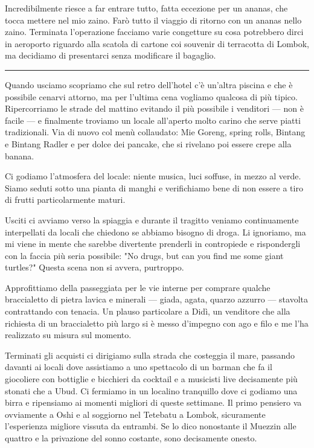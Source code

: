 Incredibilmente riesce a far entrare tutto, fatta eccezione per un ananas, che tocca mettere nel mio zaino. Farò tutto il viaggio di ritorno con un ananas nello zaino. Terminata l'operazione facciamo varie congetture su cosa potrebbero dirci in aeroporto riguardo alla scatola di cartone coi souvenir di terracotta di Lombok, ma decidiamo di presentarci senza modificare il bagaglio.

\begin{center}
    \noindent\rule{0.6\textwidth}{0.4pt}
\end{center}

Quando usciamo scopriamo che sul retro dell'hotel c'è un'altra piscina e che è possibile cenarvi attorno, ma per l'ultima cena vogliamo qualcosa di più tipico. Ripercorriamo le strade del mattino evitando il più possibile i venditori — non è facile — e finalmente troviamo un locale all'aperto molto carino che serve piatti tradizionali. Via di nuovo col menù collaudato: Mie Goreng, spring rolls, Bintang e Bintang Radler e per dolce dei pancake, che si rivelano poi essere crepe alla banana.

Ci godiamo l'atmosfera del locale: niente musica, luci soffuse, in mezzo al verde. Siamo seduti sotto una pianta di manghi e verifichiamo bene di non essere a tiro di frutti particolarmente maturi.

Usciti ci avviamo verso la spiaggia e durante il tragitto veniamo continuamente interpellati da locali che chiedono se abbiamo bisogno di droga. Li ignoriamo, ma mi viene in mente che sarebbe divertente prenderli in contropiede e rispondergli con la faccia più seria possibile: "No drugs, but can you find me some giant turtles?" Questa scena non si avvera, purtroppo.

Approfittiamo della passeggiata per le vie interne per comprare qualche braccialetto di pietra lavica e minerali — giada, agata, quarzo azzurro — stavolta contrattando con tenacia. Un plauso particolare a Didì, un venditore che alla richiesta di un braccialetto più largo si è messo d'impegno con ago e filo e me l'ha realizzato su misura sul momento.

Terminati gli acquisti ci dirigiamo sulla strada che costeggia il mare, passando davanti ai locali dove assistiamo a uno spettacolo di un barman che fa il giocoliere con bottiglie e bicchieri da cocktail e a musicisti live decisamente più stonati che a Ubud. Ci fermiamo in un localino tranquillo dove ci godiamo una birra e ripensiamo ai momenti migliori di queste settimane. Il primo pensiero va ovviamente a Oshi e al soggiorno nel Tetebatu a Lombok, sicuramente l'esperienza migliore vissuta da entrambi. Se lo dico nonostante il Muezzin alle quattro e la privazione del sonno costante, sono decisamente onesto.

